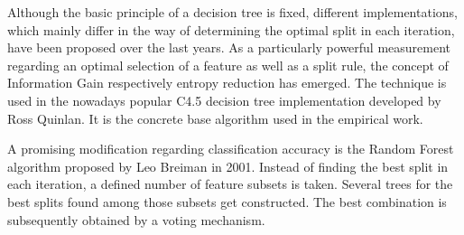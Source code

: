 Although the basic principle of a decision tree is fixed, different implementations, which mainly differ in the way of determining the optimal split in each iteration, have been proposed over the last years. As a particularly powerful measurement regarding an optimal selection of a feature as well as a split rule, the concept of Information Gain respectively entropy reduction has emerged. The technique is used in the nowadays popular C4.5 decision tree implementation developed by Ross Quinlan. It is the concrete base algorithm used in the empirical work. 

A promising modification regarding classification accuracy is the Random Forest algorithm proposed by Leo Breiman in 2001. Instead of finding the best split in each iteration, a defined number of feature subsets is taken. Several trees for the best splits found among those subsets get constructed. The best combination is subsequently obtained by a voting mechanism. 


